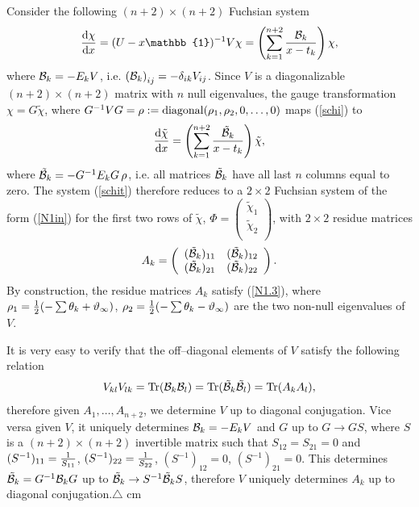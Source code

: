 \documentclass[12pt]{article}
\def\thi{{\vartheta_\infty}}
\newcommand{\ID}{\mathbb{1}}
\theoremstyle{definition}
\theoremstyle{theorem}
\begin{document}
 Consider the following $(n+2)\times(n+2)$ Fuchsian system
\begin{equation}
{{\rm d}\chi\over{\rm d}x}=(U-x\ID)^{-1}V\chi=\left(
\sum_{k=1}^{n+2}{{\cal B}_k\over x-t_k} \right)\chi,
\label{schi}
\end{equation}
where ${\cal B}_k=-E_k V$, i.e. $\left({\cal B}_k\right)_{ij}=
-\delta_{ik} V_{ij}$. Since $V$ is a diagonalizable $(n+2)\times(n+2)$ matrix
with $n$ null eigenvalues, the gauge transformation $\chi=G\tilde\chi$,
where $G^{-1}VG=\rho:={\rm diagonal}(\rho_1,\rho_2,0,\dots,0)$ maps 
(\ref{schi}) to
\begin{equation}
{{\rm d}\tilde\chi\over{\rm d}x}=\left(
\sum_{k=1}^{n+2}{\tilde{\cal B}_k\over x-t_k} \right)\tilde\chi,
\label{schit}
\end{equation}
where $\tilde{\cal B}_k=-G^{-1} E_k G\,\rho$,
i.e. all matrices $\tilde{\cal B}_k$ have all last $n$ columns equal to zero.
The system (\ref{schit}) therefore reduces to a $2\times2$ Fuchsian system
of the form (\ref{N1in})
for the first two rows of $\tilde\chi$, 
$\Phi=\left(\begin{array}{c}\tilde\chi_1\\ \tilde\chi_2\\
\end{array}\right)$, with $2\times 2$ residue matrices 
\begin{equation}
{A}_k=\left(\begin{array}{cc}
(\tilde{\cal B}_k)_{11}&(\tilde{\cal B}_k)_{12}\\
(\tilde{\cal B}_k)_{21}&(\tilde{\cal B}_k)_{22}\\
\end{array}\right).
\label{matA}\end{equation}
By construction, the residue matrices ${A}_k$ satisfy (\ref{N1.3}), 
where $\rho_1={1\over 2}(-\sum\theta_k+\thi)$, 
$\rho_2={1\over 2}(-\sum\theta_k-\thi)$ are the two non-null eigenvalues of 
$V$. 

It is very easy to verify that the off--diagonal elements of $V$ satisfy
the following relation
$$
V_{kl} V_{lk} = {\rm Tr}({\mathcal B}_k{\mathcal B}_l) =
{\rm Tr}(\tilde{\mathcal B}_k\tilde{\mathcal B}_l) =
{\rm Tr}({A}_k{A}_l),
$$
therefore given ${A}_1,\dots,{A}_{n+2}$, we determine
$V$ up to diagonal conjugation. 
Vice versa given $V$, it uniquely determines ${\cal B}_k=-E_k V$ and $G$
up to $G\to G S$, where $S$ is a $(n+2)\times(n+2)$ invertible matrix such that
$S_{12}=S_{21}=0$ and $(S^{-1})_{11}={1\over S_{11}}$, $(S^{-1})_{22}=
{1\over S_{22}}$, $(S^{-1})_{12}=0$, $(S^{-1})_{21}=0$. This determines 
$\tilde{\cal B}_k=G^{-1}{\cal B}_kG$
up to $\tilde{\cal B}_k\to S^{-1}\tilde{\cal B}_k S$, therefore  
$V$ uniquely determines ${A}_k$
up to diagonal conjugation.{\hfill $\bigtriangleup$}
 cm
\end{document}
